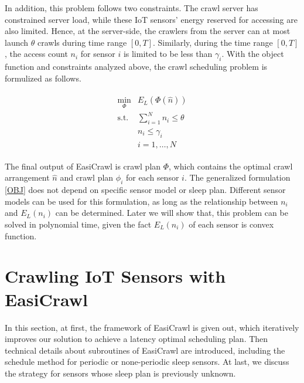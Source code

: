 \documentclass[conference]{IEEEtran}
\begin{document}
In addition, this problem follows two constraints. 
The crawl server has constrained server load, while these IoT sensors' energy reserved for accessing are also limited.
Hence, at the server-side, the crawlers from the server can at most launch $\theta$ crawls during time range $[0,T]$. 
Similarly, during the time range $[0, T]$, the access count $n_i$ for sensor $i$ is limited to be less than $\gamma_i$. 
With the object function and constraints analyzed above,  the crawl scheduling problem is formulized as follows.

\begin{eqnarray}
\begin{array}{ll}
\min_{\Phi}& E_L(\Phi(\hat{n}))\\
\text{s.t.}
& \sum_{i=1}^{N} n_i \leq\theta\\
&n_i\leq\gamma_i\\
&i=1,\ldots,N
\end{array}\label{OBJ}
\end{eqnarray}

The final output of EasiCrawl is crawl plan $\Phi$, which contains the optimal crawl arrangement $\hat{n}$ and crawl plan $\phi_i$ for each sensor $i$.
The generalized formulation \eqref{OBJ} does not depend on specific sensor model or sleep plan. 
Different sensor models can be used for this formulation, as long as the relationship between $n_i$ and $E_L(n_i)$ can be determined.
Later we will show that, this problem can be solved in polynomial time, given the fact $E_L(n_i)$ of each sensor is convex function.

\section{Crawling IoT Sensors with EasiCrawl} \label{easicrawl}

In this section, at first, the framework of EasiCrawl is given out, which iteratively improves our solution to achieve a latency optimal scheduling plan. 
Then technical details about subroutines of EasiCrawl are introduced, including the schedule method for periodic or none-periodic sleep sensors. 
At last, we discuss the strategy for sensors whose sleep plan is previously unknown.
\end{document}
